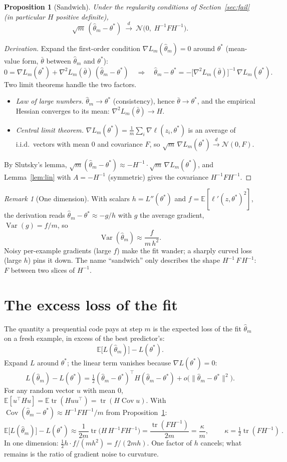 \documentclass[11pt]{article}
\newtheorem{proposition}{Proposition}
\theoremstyle{remark}
\newtheorem*{remark}{Remark}
\newcommand{\E}{\mathbb{E}}
\newcommand{\Cov}{\operatorname{Cov}}
\newcommand{\tr}{\operatorname{tr}}
\newcommand{\ts}{\theta^*}
\newcommand{\hth}{\hat\theta_m}
\begin{document}
\begin{proposition}[Sandwich]\label{prop:sandwich}
Under the regularity conditions of Section~\ref{sec:fail} (in particular $H$ positive definite),
\[
\sqrt m\,(\hth-\ts)\ \xrightarrow{d}\ \mathcal N\bigl(0,\;H^{-1}FH^{-1}\bigr).
\]
\end{proposition}
\begin{proof}[Derivation]
Expand the first-order condition $\nabla L_m(\hth)=0$ around $\ts$ (mean-value form, $\bar\theta$ between $\hth$ and $\ts$):
\[
0=\nabla L_m(\ts)+\nabla^2L_m(\bar\theta)\,(\hth-\ts)
\quad\Longrightarrow\quad
\hth-\ts=-\bigl[\nabla^2L_m(\bar\theta)\bigr]^{-1}\,\nabla L_m(\ts).
\]
Two limit theorems handle the two factors.
\begin{itemize}
\item \emph{Law of large numbers.} $\hth\to\ts$ (consistency), hence $\bar\theta\to\ts$, and the empirical Hessian converges to its mean: $\nabla^2L_m(\bar\theta)\to H$.
\item \emph{Central limit theorem.} $\nabla L_m(\ts)=\frac1m\sum_i\nabla\ell(z_i,\ts)$ is an average of i.i.d.\ vectors with mean $0$ and covariance $F$, so $\sqrt m\,\nabla L_m(\ts)\xrightarrow{d}\mathcal N(0,F)$.
\end{itemize}
By Slutsky's lemma, $\sqrt m(\hth-\ts)\approx -H^{-1}\cdot\sqrt m\,\nabla L_m(\ts)$, and Lemma~\ref{lem:lin} with $A=-H^{-1}$ (symmetric) gives the covariance $H^{-1}FH^{-1}$.
\end{proof}

\begin{remark}[One dimension]
With scalars $h=L''(\ts)$ and $f=\E[\ell'(z,\ts)^2]$, the derivation reads $\hth-\ts\approx-g/h$ with $g$ the average gradient, $\operatorname{Var}(g)=f/m$, so
\[
\operatorname{Var}(\hth)\approx\frac{f}{m\,h^2}.
\]
Noisy per-example gradients (large $f$) make the fit wander; a sharply curved loss (large $h$) pins it down. The name ``sandwich'' only describes the shape $H^{-1}\,F\,H^{-1}$: $F$ between two slices of $H^{-1}$.
\end{remark}

\section{The excess loss of the fit}
\label{sec:excess}

The quantity a prequential code pays at step $m$ is the expected loss of the fit $\hth$ on a fresh example, in excess of the best predictor's:
\[
\E\bigl[L(\hth)\bigr]-L(\ts).
\]
Expand $L$ around $\ts$; the linear term vanishes because $\nabla L(\ts)=0$:
\[
L(\hth)-L(\ts)=\tfrac12(\hth-\ts)^\top H(\hth-\ts)+o\bigl(\|\hth-\ts\|^2\bigr).
\]
For any random vector $u$ with mean $0$, $\E[u^\top Hu]=\E\tr(Huu^\top)=\tr(H\Cov u)$. With $\Cov(\hth-\ts)\approx H^{-1}FH^{-1}/m$ from Proposition~\ref{prop:sandwich}:
\[
\E\bigl[L(\hth)\bigr]-L(\ts)\approx\frac{1}{2m}\tr\bigl(H\,H^{-1}FH^{-1}\bigr)=\frac{\tr(FH^{-1})}{2m}=\frac{\kappa}{m},
\qquad
\boxed{\ \kappa=\tfrac12\tr(FH^{-1})\ }.
\]
In one dimension: $\tfrac12 h\cdot f/(mh^2)=f/(2mh)$. One factor of $h$ cancels; what remains is the ratio of gradient noise to curvature.
\end{document}
